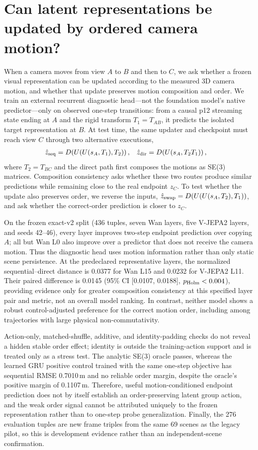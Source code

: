\section{Can latent representations be updated by ordered camera motion?}
\label{sec:se3_one_step_generalization}

When a camera moves from view $A$ to $B$ and then to $C$, we ask whether a
frozen visual representation can be updated according to the measured 3D
camera motion, and whether that update preserves motion composition and order.
We train an external recurrent diagnostic head---not the foundation model's
native predictor---only on observed one-step transitions: from a causal p12
streaming state ending at $A$ and the rigid transform $T_1=T_{AB}$, it
predicts the isolated target representation at $B$. At test time, the same
updater and checkpoint must reach view $C$ through two alternative executions,
\begin{align}
\hat z_{\rm seq} &= D\!\left(U(U(s_A,T_1),T_2)\right), &
\hat z_{\rm dir} &= D\!\left(U(s_A,T_2T_1)\right),
\end{align}
where $T_2=T_{BC}$ and the direct path first composes the motions as SE(3)
matrices. Composition consistency asks whether these two routes produce similar
predictions while remaining close to the real endpoint $z_C$. To test whether
the update also preserves order, we reverse the inputs,
$\hat z_{\rm swap}=D(U(U(s_A,T_2),T_1))$, and ask whether the correct-order
prediction is closer to $z_C$.

On the frozen exact-v2 split (436 tuples, seven Wan layers, five V-JEPA2 layers,
and seeds 42--46), every layer improves two-step endpoint prediction over
copying $A$; all but Wan L0 also improve over a predictor that does not receive
the camera motion. Thus the diagnostic head uses motion information rather
than only static scene persistence. At the predeclared representative layers,
the normalized sequential--direct distance is
0.0377 for Wan L15 and
0.0232 for V-JEPA2 L11. Their paired difference is
0.0145 (95\% CI
[0.0107,
0.0188],
$p_{\rm Holm}<0.004$), providing evidence only for greater composition
consistency at this specified layer pair and metric, not an overall model
ranking. In contrast, neither model shows a robust control-adjusted preference
for the correct motion order, including among trajectories with large physical
non-commutativity.

Action-only, matched-shuffle, additive, and identity-padding checks do not
reveal a hidden stable order effect; identity is outside the training-action
support and is treated only as a stress test. The analytic SE(3) oracle passes,
whereas the learned GRU positive control trained with the same one-step
objective has sequential RMSE 0.7010\,m and no reliable order margin,
despite the oracle's positive margin of 0.1107\,m. Therefore, useful
motion-conditioned endpoint prediction does not by itself establish an
order-preserving latent group action, and the weak order signal cannot be
attributed uniquely to the frozen representation rather than to one-step probe
generalization. Finally, the 276 evaluation tuples are new frame triples from
the same 69 scenes as the legacy pilot, so this is development evidence rather
than an independent-scene confirmation.


